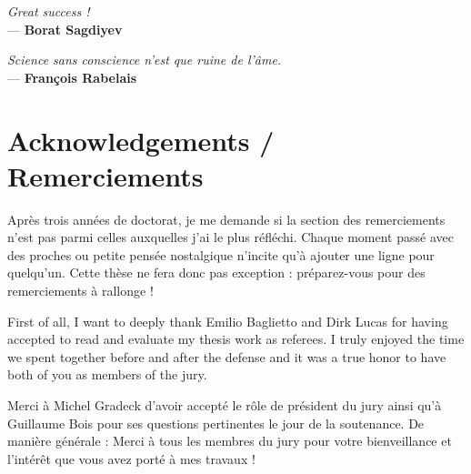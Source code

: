 

\vspace*{4cm}


\begin{flushleft}{\slshape    
Great success !} \\ \medskip
--- \textbf{Borat Sagdiyev}
\end{flushleft}

\vspace*{2cm}

\begin{flushright}{\slshape    
Science sans conscience n'est que ruine de l'âme.} \\ \medskip
--- \textbf{Fran\c{c}ois Rabelais}
\end{flushright}

\npar




\bigskip

\clearpage

\begingroup

\let\clearpage\relax
\let\cleardoublepage\relax
\let\cleardoublepage\relax

\chapter*{Acknowledgements / Remerciements}

Après trois années de doctorat, je me demande si la section des remerciements n'est pas parmi celles auxquelles j'ai le plus réfléchi. Chaque moment passé avec des proches ou petite pensée nostalgique n'incite qu'à ajouter une ligne pour quelqu'un. Cette thèse ne fera donc pas exception : préparez-vous pour des remerciements à rallonge ! 


\npar

First of all, I want to deeply thank Emilio Baglietto and Dirk Lucas for having accepted to read and evaluate my thesis work as referees. I truly enjoyed the time we spent together before and after the defense and it was a true honor to have both of you as members of the jury. 

Merci à Michel Gradeck d'avoir accepté le rôle de président du jury ainsi qu'à Guillaume Bois pour ses questions pertinentes le jour de la soutenance. De manière générale : Merci à tous les membres du jury pour votre bienveillance et l'intérêt que vous avez porté à mes travaux !

